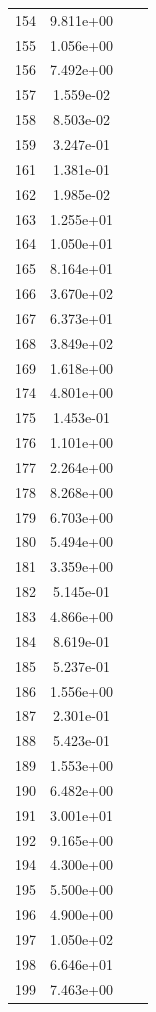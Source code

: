 \documentclass[12pt]{article}
\begin{document}
\begin{longtable}{@{}cccc@{}}
154 & 9.811e+00 &  &  \\
155 & 1.056e+00 &  &  \\
156 & 7.492e+00 &  &  \\
157 & 1.559e-02 &  &  \\
158 & 8.503e-02 &  &  \\
159 & 3.247e-01 &  &  \\
161 & 1.381e-01 &  &  \\
162 & 1.985e-02 &  &  \\
163 & 1.255e+01 &  &  \\
164 & 1.050e+01 &  &  \\
165 & 8.164e+01 &  &  \\
166 & 3.670e+02 &  &  \\
167 & 6.373e+01 &  &  \\
168 & 3.849e+02 &  &  \\
169 & 1.618e+00 &  &  \\
174 & 4.801e+00 &  &  \\
175 & 1.453e-01 &  &  \\
176 & 1.101e+00 &  &  \\
177 & 2.264e+00 &  &  \\
178 & 8.268e+00 &  &  \\
179 & 6.703e+00 &  &  \\
180 & 5.494e+00 &  &  \\
181 & 3.359e+00 &  &  \\
182 & 5.145e-01 &  &  \\
183 & 4.866e+00 &  &  \\
184 & 8.619e-01 &  &  \\
185 & 5.237e-01 &  &  \\
186 & 1.556e+00 &  &  \\
187 & 2.301e-01 &  &  \\
188 & 5.423e-01 &  &  \\
189 & 1.553e+00 &  &  \\
190 & 6.482e+00 &  &  \\
191 & 3.001e+01 &  &  \\
192 & 9.165e+00 &  &  \\
194 & 4.300e+00 &  &  \\
195 & 5.500e+00 &  &  \\
196 & 4.900e+00 &  &  \\
197 & 1.050e+02 &  &  \\
198 & 6.646e+01 &  &  \\
199 & 7.463e+00 &  &  \\

\end{longtable}
\end{document}

